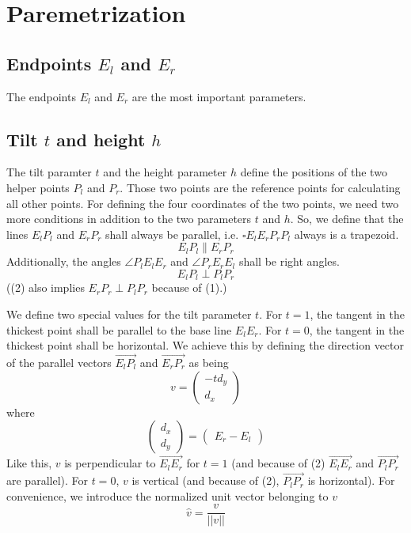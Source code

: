 \documentclass{article}
\begin{document}

\section{Paremetrization}
\subsection{Endpoints $E_l$ and $E_r$}
The endpoints $E_l$ and $E_r$ are the most important parameters.
\subsection{Tilt $t$ and height $h$}
The tilt paramter $t$ and the height parameter $h$ define the positions of the two helper points $P_l$ and $P_r$.
Those two points are the reference points for calculating all other points.
For defining the four coordinates of the two points, we need two more conditions in addition to the two parameters $t$ and $h$.
So, we define that the lines $E_l P_l$ and $E_r P_r$ shall always be parallel, i.e. $\square E_l E_r P_r P_l$ always is a trapezoid.
\begin{equation}E_l P_l \parallel E_r P_r\end{equation}
Additionally, the angles $\angle P_l E_l E_r$ and $\angle P_r E_r E_l$ shall be right angles.
\begin{equation}E_l P_l \perp P_l P_r \end{equation}
((2) also implies $E_r P_r \perp P_l P_r$ because of (1).)

We define two special values for the tilt parameter $t$.
For $t=1$, the tangent in the thickest point shall be parallel to the base line $E_l E_r$.
For $t=0$, the tangent in the thickest point shall be horizontal.
We achieve this by defining the direction vector of the parallel vectors $\overrightarrow{E_l P_l}$ and $\overrightarrow{E_r P_r}$ as being
\begin{equation}v=\begin{pmatrix}-td_y\\d_x\end{pmatrix}\end{equation}
where
$$\begin{pmatrix}d_x\\d_y\end{pmatrix}=\begin{pmatrix}E_r - E_l\end{pmatrix}$$
Like this, $v$ is perpendicular to $\overrightarrow{E_l E_r}$ for $t=1$
(and because of (2) $\overrightarrow{E_l E_r}$ and $\overrightarrow{P_l P_r}$ are parallel).
For $t=0$, $v$ is vertical (and because of (2), $\overrightarrow{P_l P_r}$ is horizontal).
For convenience, we introduce the normalized unit vector belonging to $v$
$$\hat{v}=\frac{v}{||v||}$$
\end{document}
